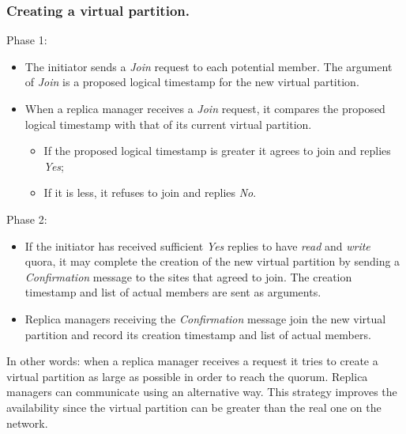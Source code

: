 \newpage
\subsubsection{Creating a virtual partition.}
Phase 1:
\begin{itemize}
	\item The initiator sends a \textit{Join} request to each potential member. The argument of \textit{Join} is a proposed logical timestamp for the new virtual partition.
	\item When a replica manager receives a \textit{Join} request, it compares the proposed logical timestamp with that of its current virtual partition.
	\begin{itemize}
		\item If the proposed logical timestamp is greater it agrees to join and replies \textit{Yes};
		\item If it is less, it refuses to join and replies \textit{No}.
	\end{itemize}
\end{itemize}
Phase 2:
\begin{itemize}
	\item If the initiator has received sufficient \textit{Yes} replies to have \textit{read} and \textit{write} quora, it may complete the creation of the new virtual partition by sending a \textit{Confirmation} message to the sites that agreed to join. The creation timestamp and list of actual members are sent as arguments.
	\item Replica managers receiving the \textit{Confirmation} message join the new virtual partition and record its creation timestamp and list of actual members.
\end{itemize}

In other words: when a replica manager receives a request it tries to create a virtual partition as large as possible in order to reach the quorum. Replica managers can communicate using an alternative way. This strategy improves the availability since the virtual partition can be greater than the real one on the network.